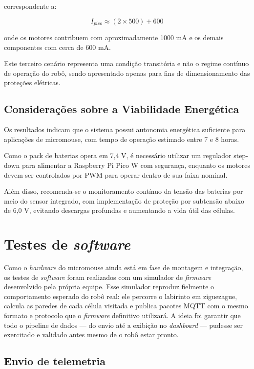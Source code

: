correspondente a:

\begin{equation}
I_{pico} \approx (2 \times 500) + 600
\end{equation}

onde os motores contribuem com aproximadamente 1000 mA e os demais componentes com cerca de 600 mA.

Este terceiro cenário representa uma condição transitória e não o regime contínuo de operação do robô, sendo apresentado apenas para fins de dimensionamento das proteções elétricas.

\subsection{Considerações sobre a Viabilidade Energética}

Os resultados indicam que o sistema possui autonomia energética suficiente para aplicações de micromouse, com tempo de operação estimado entre 7 e 8 horas.

Como o pack de baterias opera em 7,4 V, é necessário utilizar um regulador step-down para alimentar a Raspberry Pi Pico W com segurança, enquanto os motores devem ser controlados por PWM para operar dentro de sua faixa nominal.

Além disso, recomenda-se o monitoramento contínuo da tensão das baterias por meio do sensor integrado, com implementação de proteção por subtensão abaixo de 6,0 V, evitando descargas profundas e aumentando a vida útil das células.

\section{Testes de \textit{software}}

Como o \textit{hardware} do micromouse ainda está em fase de montagem e integração, os testes de \textit{software} foram realizados com um simulador de \textit{firmware} desenvolvido pela própria equipe. Esse simulador reproduz fielmente o comportamento esperado do robô real: ele percorre o labirinto em ziguezague, calcula as paredes de cada célula visitada e publica pacotes MQTT com o mesmo formato e protocolo que o \textit{firmware} definitivo utilizará. A ideia foi garantir que todo o pipeline de dados — do envio até a exibição no \textit{dashboard} — pudesse ser exercitado e validado antes mesmo de o robô estar pronto.

\subsection{Envio de telemetria}

